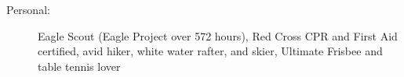 \documentclass[letterpaper,11pt]{article}
\begin{document}
\begin{description}
	\item[Personal:]Eagle Scout (Eagle Project over 572 hours), 		Red Cross CPR and First Aid certified, avid hiker, 				white water rafter, and skier, Ultimate Frisbee and 				table tennis lover
\end{description}
\end{document}
